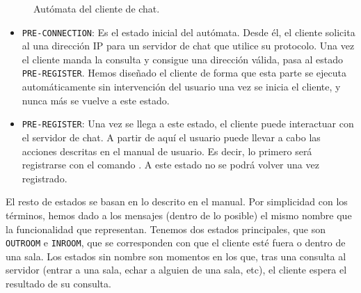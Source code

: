 \begin{figure}[H]
    \caption{Autómata del cliente de chat.}
    \label{aut_cliente}
\end{figure}

\begin{itemize}
    \item \lstinline!PRE-CONNECTION!: Es el estado inicial del autómata. Desde él, el cliente solicita al  una dirección IP para un servidor de chat que utilice su protocolo. Una vez el cliente manda la consulta y consigue una dirección válida, pasa al estado \lstinline!PRE-REGISTER!. Hemos diseñado el cliente de forma que esta parte se ejecuta automáticamente sin intervención del usuario una vez se inicia el cliente, y nunca más se vuelve a este estado.
    \item \lstinline!PRE-REGISTER!: Una vez se llega a este estado, el cliente puede interactuar con el servidor de chat. A partir de aquí el usuario puede llevar a cabo las acciones descritas en el manual de usuario. Es decir, lo primero será registrarse con el comando . A este estado no se podrá volver una vez registrado.
\end{itemize}

El resto de estados se basan en lo descrito en el manual. Por simplicidad con los términos, hemos dado a los mensajes (dentro de lo posible) el mismo nombre que la funcionalidad que representan. Tenemos dos estados principales, que son \lstinline{OUTROOM} e \lstinline{INROOM}, que se corresponden con que el cliente esté fuera o dentro de una sala. Los estados sin nombre son momentos en los que, tras una consulta al servidor (entrar a una sala, echar a alguien de una sala, etc), el cliente espera el resultado de su consulta.


